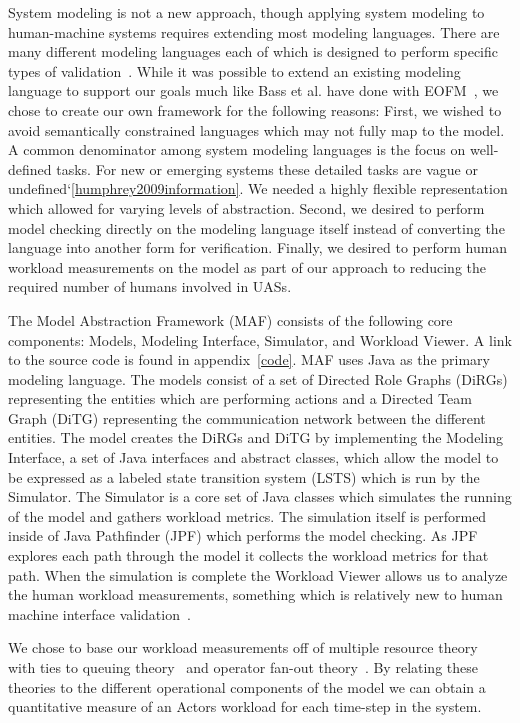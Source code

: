 System modeling is not a new approach, though applying system modeling to human-machine systems requires extending most modeling languages.  There are many different modeling languages each of which is designed to perform specific types of validation~\cite{bolton2013litreview}.  While it was possible to extend an existing modeling language to support our goals much like Bass et al. have done with EOFM~\cite{bass2011toward}, we chose to create our own framework for the following reasons:  
First, we wished to avoid semantically constrained languages which may not fully map to the model.  A common denominator among system modeling languages is the focus on well-defined tasks.  For new or emerging systems these detailed tasks are vague or undefined`\ref{humphrey2009information}.  We needed a highly flexible representation which allowed for varying levels of abstraction.  
Second, we desired to perform model checking directly on the modeling language itself instead of converting the language into another form for verification.
Finally, we desired to perform human workload measurements on the model as part of our approach to reducing the required number of humans involved in UASs.

The Model Abstraction Framework (MAF) consists of the following core components:  Models, Modeling Interface, Simulator, and Workload Viewer.  A link to the source code is found in appendix~\ref{code}.  MAF uses Java as the primary modeling language.  The models consist of a set of Directed Role Graphs (DiRGs) representing the entities which are performing actions and a Directed Team Graph (DiTG) representing the communication network between the different entities.  The model creates the DiRGs and DiTG by implementing the Modeling Interface, a set of Java interfaces and abstract classes, which allow the model to be expressed as a labeled state transition system (LSTS) which is run by the Simulator.  The Simulator is a core set of Java classes which simulates the running of the model and gathers workload metrics.  The simulation itself is performed inside of Java Pathfinder (JPF) which performs the model checking.  As JPF explores each path through the model it collects the workload metrics for that path.  When the simulation is complete the Workload Viewer allows us to analyze the human workload measurements, something which is relatively new to human machine interface validation~\cite{bolton2013litreview}.

We chose to base our workload measurements off of multiple resource theory~\cite{wickens2002multiple} with ties to queuing theory~\cite{newell1994unified} and operator fan-out theory~\cite{goodrich2010fanout}.  By relating these theories to the different operational components of the model we can obtain a quantitative measure of an Actors workload for each time-step in the system.

